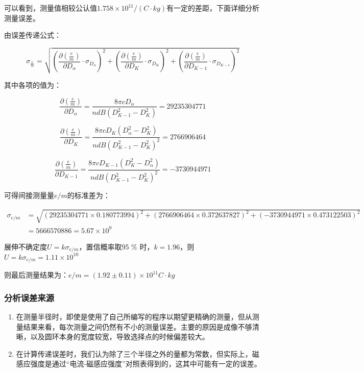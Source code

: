 \documentclass[dvipsnames, svgnames,a4paper,11pt]{article}
\begin{document}
		可以看到，测量值相较公认值$1.758 \times 10^{11} / (C \cdot kg)$有一定的差距，下面详细分析测量误差。


		由误差传递公式：

		\[
			\sigma_{\frac{e}{m}} = \sqrt{\left(\frac{\partial\left(\frac{e}{m}\right)}{\partial D_\alpha} \cdot \sigma_{D_\alpha}\right)^2 + \left(\frac{\partial\left(\frac{e}{m}\right)}{\partial D_K} \cdot \sigma_{D_K}\right)^2 + \left(\frac{\partial\left(\frac{e}{m}\right)}{\partial D_{K-1}} \cdot \sigma_{D_{K-1}}\right)^2}
		\]

		其中各项的值为：

		\[
			\frac{\partial\left(\frac{e}{m}\right)}{\partial D_\alpha} = \frac{8\pi c D_\alpha}{n d B (D_{K-1}^2 - D^2_{K})} = 29235304771
		\]

		\[
			\frac{\partial\left(\frac{e}{m}\right)}{\partial D_K} = \frac{8\pi c D_K (D_{\alpha}^2 - D_K^2) }{n d B (D_{K-1}^2 - D^2_{K})^2} = 2766906464
		\]

		\[
			\frac{\partial\left(\frac{e}{m}\right)}{\partial D_{K-1}} = \frac{8\pi c D_{K-1} (D_K^2 - D_{\alpha}^2) }{n d B (D_{K-1}^2 - D^2_{K})^2 } = -3730944971
		\]

		可得间接测量量$e/m$的标准差为：

		\[
			\begin{aligned}
			\sigma_{e/m} &= \sqrt{(29235304771 \times 0.180773994)^2 + (2766906464 \times 0.372637827)^2 + (-3730944971 \times 0.473122503)^2 } \\
			&= 5666570886 = 5.67 \times 10^9
			\end{aligned}
		\]


		展伸不确定度$U = k \sigma_{e/m}$，置信概率取95 \% 时，$k = 1.96$，则$U = k \sigma_{e/m} = 1.11 \times 10^{10}		$
		
		则最后测量结果为：$e/m = (1.92 \pm 0.11) \times 10^{11} C \cdot kg$

	\subsubsection{分析误差来源}

		\begin{enumerate}
			\item 在测量半径时，即使是使用了自己所编写的程序以期望更精确的测量，但从测量结果来看，每次测量之间仍然有不小的测量误差。主要的原因是成像不够清晰，以及圆环本身的宽度较宽，导致选择点的时候偏差较大。
			\item 在计算传递误差时，我们认为除了三个半径之外的量都为常数，但实际上，磁感应强度是通过“电流-磁感应强度”对照表得到的，这其中可能有一定的误差。
		\end{enumerate}
\end{document}
